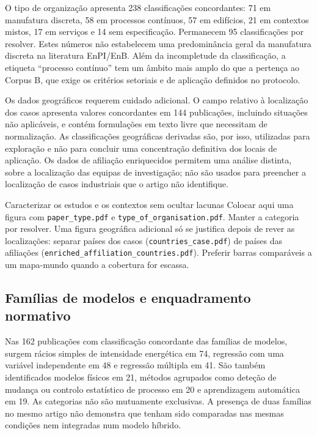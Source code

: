 O tipo de organização apresenta 238 classificações concordantes:
71 em manufatura discreta, 58 em processos contínuos, 57 em edifícios,
21 em contextos mistos, 17 em serviços e 14 sem especificação.
Permanecem 95 classificações por resolver. Estes números não
estabelecem uma predominância geral da manufatura discreta na
literatura EnPI/EnB. Além da incompletude da classificação, a etiqueta
``processo contínuo'' tem um âmbito mais amplo do que a pertença
ao Corpus B, que exige os critérios setoriais e de aplicação
definidos no protocolo.

Os dados geográficos requerem cuidado adicional. O campo relativo
à localização dos casos apresenta valores concordantes em 144
publicações, incluindo situações não aplicáveis, e contém
formulações em texto livre que necessitam de normalização.
As classificações geográficas derivadas são, por isso, utilizadas
para exploração e não para concluir uma concentração definitiva
dos locais de aplicação. Os dados de afiliação enriquecidos
permitem uma análise distinta, sobre a localização das equipas
de investigação; não são usados para preencher a localização
de casos industriais que o artigo não identifique.

{Caracterizar os estudos e os contextos sem ocultar lacunas}
{Colocar aqui uma figura com \texttt{paper\_type.pdf} e
\texttt{type\_of\_organisation.pdf}. Manter a categoria por
resolver. Uma figura geográfica adicional só se justifica depois
de rever as localizações: separar países dos casos
(\texttt{countries\_case.pdf}) de países das afiliações
(\texttt{enriched\_affiliation\_countries.pdf}). Preferir barras
comparáveis a um mapa-mundo quando a cobertura for escassa.}%

\subsection{Famílias de modelos e enquadramento normativo}

Nas 162 publicações com classificação concordante das famílias de
modelos, surgem rácios simples de intensidade energética em 74,
regressão com uma variável independente em 48 e regressão múltipla
em 41. São também identificados modelos físicos em 21, métodos
agrupados como deteção de mudança ou controlo estatístico de
processo em 20 e aprendizagem automática em 19. As categorias
não são mutuamente exclusivas. A presença de duas famílias no
mesmo artigo não demonstra que tenham sido comparadas nas mesmas
condições nem integradas num modelo híbrido.

